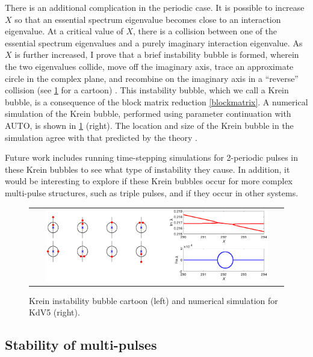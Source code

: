 \documentclass[12pt,reqno,oneside]{article}
\theoremstyle{definition}
\theoremstyle{remark}
\begin{document}
There is an additional complication in the periodic case. It is possible to increase $X$ so that an essential spectrum eigenvalue becomes close to an interaction eigenvalue. At a critical value of $X$, there is a collision between one of the essential spectrum eigenvalues and a purely imaginary interaction eigenvalue. As $X$ is further increased, I prove that a brief instability bubble is formed, wherein the two eigenvalues collide, move off the imaginary axis, trace an approximate circle in the complex plane, and recombine on the imaginary axis in a ``reverse''  collision (see \cref{fig:kreinbubble1} for a cartoon) \cite{ParkerKdV}. This instability bubble, which we call a Krein bubble, is a consequence of the block matrix reduction \cref{blockmatrix}. A numerical simulation of the Krein bubble, performed using parameter continuation with AUTO, is shown in \cref{fig:kreinbubble1} (right). The location and size of the Krein bubble in the simulation agree with that predicted by the theory \cite{ParkerKdV}.

Future work includes running time-stepping simulations for 2-periodic pulses in these Krein bubbles to see what type of instability they cause. In addition, it would be interesting to explore if these Krein bubbles occur for more complex multi-pulse structures, such as triple pulses, and if they occur in other systems.

\begin{figure}[H]
\begin{center}
\begin{tabular}{c}
\includegraphics[width=0.9\textwidth]{images/KreinBubbleBoth}
\end{tabular}
\end{center}
\caption{Krein instability bubble cartoon (left) and numerical simulation for KdV5 (right).}
\label{fig:kreinbubble1}
\end{figure}

\subsection{Stability of multi-pulses}
\end{document}
